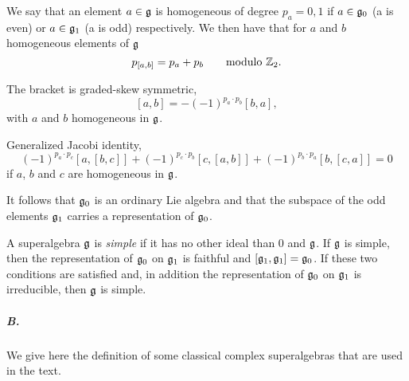 \documentclass[a4paper,12pt]{article}
\begin{document}
\smallskip

 We say that an element $a\in \mathfrak{g}$ is
homogeneous of degree $p_a=0,1$ if $a\in \mathfrak{g}_0$ (a is even) or
$a\in \mathfrak{g}_1$ (a is odd) respectively. We then have that for $a$
and $b$ homogeneous elements of $\mathfrak{g}$ $$p_{[a,b]}=p_a+p_b\qquad
\hbox{modulo } \mathbb{Z}_2.$$


\smallskip

 The bracket is graded-skew symmetric,
$$[a,b]=-(-1)^{p_a\cdot p_b}[b,a],$$ with $a$ and $b$ homogeneous
in $\mathfrak{g}$.


\smallskip

 Generalized Jacobi identity, $$(-1)^{p_a\cdot
p_c}[a,[b,c]]+(-1)^{p_c\cdot p_b}[c,[a,b]]+(-1)^{p_b\cdot
p_a}[b,[c,a]]=0$$ if $a$, $b$ and $c$ are homogeneous in $\mathfrak{g}$.

\smallskip

It follows that $\mathfrak{g}_0$ is an ordinary Lie algebra and that the
subspace of the odd elements $\mathfrak{g}_1$ carries a representation of
$\mathfrak{g}_0$.

\bigskip

A superalgebra $\mathfrak{g}$ is {\it simple} if it has no other ideal than
$0$ and $\mathfrak{g}$. If $\mathfrak{g}$ is simple, then the representation of
$\mathfrak{g}_0$ on $\mathfrak{g}_1$ is faithful and $[\mathfrak{g}_1,\mathfrak{g}_1]=\mathfrak{g}_0$.  If
these two conditions are satisfied and, in addition the
representation of $\mathfrak{g}_0$ on $\mathfrak{g}_1$ is irreducible, then $\mathfrak{g}$ is
simple.

\subparagraph{B.} We give here the definition of some classical
complex superalgebras that are used in the text.

\bigskip
\end{document}
